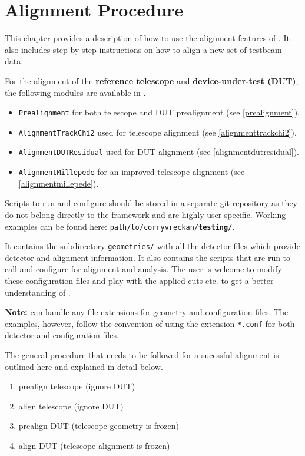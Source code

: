 \chapter{Alignment Procedure}
\label{ch:howtoalign}

This chapter provides a description of how to use the alignment features of \corry. 
It also includes step-by-step instructions on how to align a new set of testbeam data.

For the alignment of the \textbf{reference telescope} and \textbf{device-under-test (DUT)}, the following modules are available in \corry.
\begin{itemize}
\item \texttt{Prealignment} for both telescope and DUT prealignment (see \ref{prealignment}).
\item \texttt{AlignmentTrackChi2} used for telescope alignment (see \ref{alignmenttrackchi2}).
\item \texttt{AlignmentDUTResidual} used for DUT alignment (see \ref{alignmentdutresidual}).
\item \texttt{AlignmentMillepede} for an improved telescope alignment (see \ref{alignmentmillepede}).
\end{itemize}

Scripts to run and configure \corry should be stored in a separate git repository as they do not belong directly to the \corry framework and are highly user-specific.
Working examples can be found here: \texttt{path/to/corryvreckan/\textbf{testing/}}.

It contains the subdirectory \texttt{geometries/} with all the detector files which provide detector and alignment information.
It also contains the scripts that are run to call and configure \corry for alignment and analysis.
The user is welcome to modify these configuration files and play with the applied cuts etc. to get a better understanding of \corry.

\textbf{Note:} \corry can handle any file extensions for geometry and configuration files. The examples, however, follow the convention of using the extension \texttt{*.conf} for both detector and configuration files.

The general procedure that needs to be followed for a sucessful alignment is outlined here and explained in detail below.
\begin{enumerate}
\item prealign telescope (ignore DUT)
\item align telescope (ignore DUT)
\item prealign DUT (telescope geometry is frozen)
\item align DUT (telescope alignment is frozen)
\end{enumerate}


